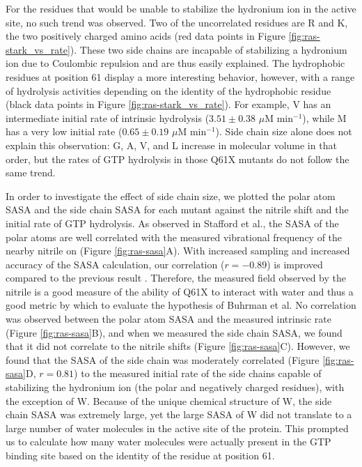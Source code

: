 For the residues that would be unable to stabilize the hydronium ion in the active site, no such trend was observed. 
Two of the uncorrelated residues are R and K, the two positively charged amino acids (red data points in Figure \ref{fig:ras-stark_vs_rate}). 
These two side chains are incapable of stabilizing a hydronium ion due to Coulombic repulsion and are thus easily explained. 
The hydrophobic residues at position 61 display a more interesting behavior, however, with a range of hydrolysis activities depending on the identity of the hydrophobic residue (black data points in Figure \ref{fig:ras-stark_vs_rate}). 
For example, V has an intermediate initial rate of intrinsic hydrolysis ($3.51 \pm 0.38$ $\mu$M min$^{-1}$), while M has a very low initial rate ($0.65 \pm 0.19$ $\mu$M min$^{-1}$).  
Side chain size alone does not explain this observation: G, A, V, and L increase in molecular volume in that order, but the rates of GTP hydrolysis in those Q61X mutants do not follow the same trend.

In order to investigate the effect of side chain size, we plotted the polar atom SASA and the side chain SASA for each mutant against the nitrile shift and the initial rate of GTP hydrolysis. 
As observed in Stafford et al., the SASA of the polar atoms are well correlated with the measured vibrational frequency of the nearby nitrile on \RalBSCN{} (Figure \ref{fig:ras-sasa}A). 
With increased sampling and increased accuracy of the SASA calculation, our correlation ($r = −0.89$) is improved compared to the previous result \cite{Stafford2012}. 
Therefore, the measured field observed by the nitrile is a good measure of the ability of Q61X to interact with water and thus a good metric by which to evaluate the hypothesis of Buhrman et al. 
No correlation was observed between the polar atom SASA and the measured intrinsic rate (Figure \ref{fig:ras-sasa}B), and when we measured the side chain SASA, we found that it did not correlate to the nitrile shifts (Figure \ref{fig:ras-sasa}C). 
However, we found that the SASA of the side chain was moderately correlated (Figure \ref{fig:ras-sasa}D, $r = 0.81$) to the measured initial rate of the side chains capable of stabilizing the hydronium ion (the polar and negatively charged residues), with the exception of W. 
Because of the unique chemical structure of W, the side chain SASA was extremely large, yet the large SASA of W did not translate to a large number of water molecules in the active site of the protein. 
This prompted us to calculate how many water molecules were actually present in the GTP binding site based on the identity of the residue at position 61.

